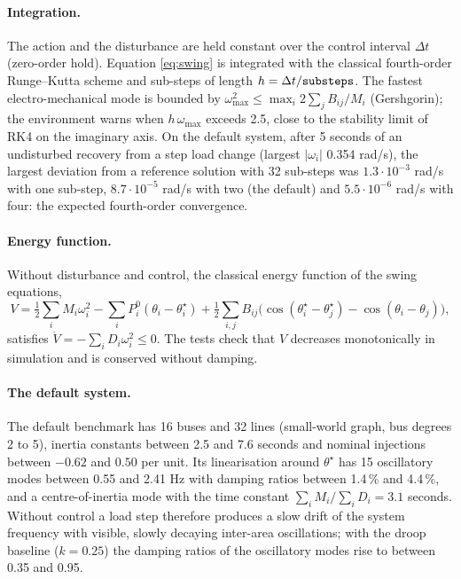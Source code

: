 \paragraph{Integration.} The action and the disturbance are held constant over
the control interval $\Delta t$ (zero-order hold). Equation \eqref{eq:swing} is
integrated with the classical fourth-order Runge--Kutta scheme and
 sub-steps of length $h = \Delta t/\texttt{substeps}$. The fastest
electro-mechanical mode is bounded by
$\omega_{\max}^2 \le \max_i 2\sum_j B_{ij}/M_i$ (Gershgorin); the environment
warns when $h\,\omega_{\max}$ exceeds 2.5, close to the stability limit of RK4 on
the imaginary axis. On the default system, after 5 seconds of an undisturbed
recovery from a step load change (largest $|\omega_i|$ 0.354 rad/s), the largest
deviation from a reference solution with 32 sub-steps was
$1.3\cdot10^{-3}$ rad/s with one sub-step, $8.7\cdot10^{-5}$ rad/s with two (the
default) and $5.5\cdot10^{-6}$ rad/s with four: the expected fourth-order
convergence.

\paragraph{Energy function.} Without disturbance and control, the classical
energy function of the swing equations,
\begin{equation}
  V = \tfrac12 \sum_i M_i \omega_i^2
      - \sum_i P_i^0 (\theta_i - \theta^\star_i)
      + \tfrac12 \sum_{i,j} B_{ij}
        \bigl(\cos(\theta^\star_i - \theta^\star_j) - \cos(\theta_i - \theta_j)\bigr),
\end{equation}
satisfies $\dot V = -\sum_i D_i \omega_i^2 \le 0$. The tests check that $V$
decreases monotonically in simulation and is conserved without damping.

\paragraph{The default system.} The default benchmark has 16 buses and 32 lines
(small-world graph, bus degrees 2 to 5), inertia constants between 2.5 and 7.6
seconds and nominal injections between $-0.62$ and $0.50$ per unit. Its
linearisation around $\theta^\star$ has 15 oscillatory modes between 0.55 and
2.41 Hz with damping ratios between 1.4\,\% and 4.4\,\%, and a
centre-of-inertia mode with the time constant $\sum_i M_i/\sum_i D_i = 3.1$
seconds. Without control a load step therefore produces a slow drift of the
system frequency with visible, slowly decaying inter-area oscillations; with
the droop baseline ($k = 0.25$) the damping ratios of the oscillatory modes
rise to between 0.35 and 0.95.


